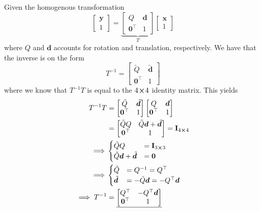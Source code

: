 \documentclass[a4paper]{scrartcl}
\begin{document}
Given the homogenous transformation
\begin{equation}
    \begin{bmatrix}
        \bm{y} \\ 1
    \end{bmatrix} = 
    \underbrace{\begin{bmatrix}
        Q & \bm{d} \\ \bm{0}^\top & 1 
    \end{bmatrix}}_{T}
    \begin{bmatrix}
        \bm{x} \\ 1
    \end{bmatrix}
\end{equation}
where $Q$ and $\bm{d}$ accounts for rotation and translation, respectively. We have that the inverse
is on the form 
\begin{equation}
        T^{-1} = \begin{bmatrix}
            \tilde{Q} & \tilde{\bm{d}} \\ \bm{0}^\top & 1
        \end{bmatrix}
\end{equation}
where we know that $T^{-1}T$ is equal to the $4\!\cross\!4$ identity matrix. This yields
\begin{equation} \label{eq:invtrans}
    \begin{aligned}
        T^{-1}T &= \begin{bmatrix}
             \tilde{Q} & \tilde{\bm{d}} \\ \bm{0}^\top & 1
        \end{bmatrix}
        \begin{bmatrix}
            Q & \bm{d} \\ \bm{0}^\top & 1
        \end{bmatrix} \\
        &= \begin{bmatrix}
            \tilde{Q}Q & \tilde{Q}\bm{d} + \tilde{\bm{d}} \\ \bm{0}^\top & 1
        \end{bmatrix} = \mathbf{I}_{4\cross4}\\
        \implies &\begin{cases}
            \tilde{Q}Q &= \mathbf{I}_{3\cross3} \\
             \tilde{Q}\bm{d} + \tilde{\bm{d}} &= \bm{0}
        \end{cases}\\
        \implies &\begin{cases}
            \tilde{Q} &= Q^{-1} = Q^\top \\
            \tilde{\bm{d}} &= -\tilde{Q}\bm{d} = -Q^\top \bm{d}
        \end{cases}\\
        \implies T^{-1} &=\underline{ \begin{bmatrix}
            Q^\top & -Q^\top \bm{d} \\ \bm{0}^\top & 1
        \end{bmatrix}
        }
    \end{aligned}
\end{equation}
\end{document}
